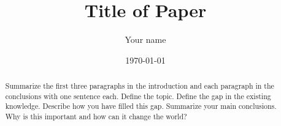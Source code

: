\documentclass[aps,prl,groupedaddress,twocolumn]{revtex4-1}
\begin{document}

\title{Title of Paper}


\author{Your name}


\date{\today}

\begin{abstract}
Summarize the first three paragraphs in the introduction and each paragraph in the conclusions with one sentence each. Define the topic. Define the gap in the existing knowledge. Describe how you have filled this gap. Summarize your main conclusions. Why is this important and how can it change the world?
\end{abstract}


\maketitle
\end{document}
